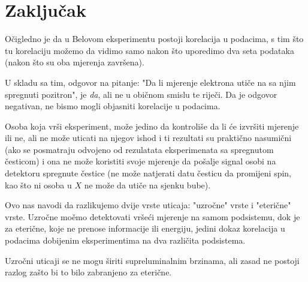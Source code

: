 \chapter*{Zaključak}

O\v cigledno je da u Belovom eksperimentu postoji korelacija u podacima, s tim \v sto tu korelaciju mo\v zemo da vidimo
samo nakon \v sto uporedimo dva seta podataka (nakon \v sto su oba mjerenja zavr\v sena).

U skladu sa tim, odgovor na pitanje: "Da li mjerenje elektrona uti\v ce na sa njim spregnuti pozitron", je {\it{da}}, ali ne u obi\v cnom smislu te rije\v ci.
Da je odgovor negativan, ne bismo mogli objasniti korelacije u podacima.

Osoba koja vr\v si eksperiment, mo\v ze jedino da kontroli\v se da li \' ce izvr\v siti mjerenje ili ne, ali ne mo\v ze uticati na njegov ishod i ti rezultati su prakti\v cno
nasumi\v cni (ako se posmatraju odvojeno od rezulatata eksperimenata sa spregnutom \v cesticom) i ona ne mo\v ze koristiti svoje mjerenje da po\v salje signal osobi
na detektoru spregnute \v cestice (ne mo\v ze natjerati datu \v cesticu da promijeni spin, kao \v sto ni osoba u $X$ ne mo\v ze da uti\v ce na sjenku bube).

Ovo nas navodi da razlikujemo dvije vrste uticaja: "uzro\v cne" vrste i "eteri\v cne" vrste.
Uzro\v cne mo\v emo detektovati vr\v se\' ci mjerenje na samom podsistemu, dok je za eteri\v cne, koje ne prenose informacije ili energiju, jedini dokaz
korelacija u podacima dobijenim eksperimentima na dva razli\v cita podsistema.

Uzro\v cni uticaji se ne mogu \v siriti supreluminalnim brzinama, ali zasad ne postoji razlog za\v sto bi to bilo zabranjeno za eteri\v cne.